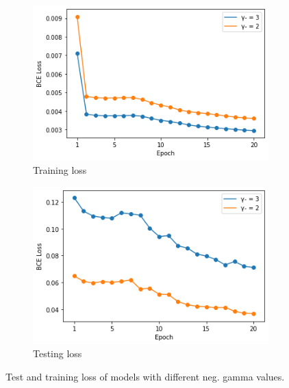 \begin{figure}
  \begin{subfigure}[t]{.5\textwidth}
    \centering
    \includegraphics[width=\textwidth]{figures/supervised_approach/asl_neg_train_loss.png}
    \caption{Training loss}
    \label{fig:asl_neg_train_loss}
  \end{subfigure}
   \begin{subfigure}[t]{.5\textwidth}
    \centering
    \includegraphics[width=\textwidth]{figures/supervised_approach/asl_neg_test_loss.png}
    \caption{Testing loss}
    \label{fig:asl_neg_test_loss}
  \end{subfigure}
  \caption{Test and training loss of models with different neg. gamma values.}
  \label{fig:asl_neg_train}
\end{figure}

